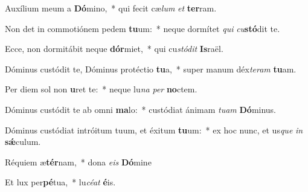 ﻿\item Auxílium meum a \textbf{Dó}mino,~* qui fecit cæ\textit{lum} \textit{et} \textbf{ter}ram.

\item Non det in commotiónem pedem \textbf{tu}um:~* neque dormítet \textit{qui} \textit{cu}\textbf{stó}dit te.

\item Ecce, non dormitábit neque \textbf{dór}miet,~* qui cu\textit{stó}\textit{dit} \textbf{Is}raël.

\item Dóminus custódit te, Dóminus protéctio \textbf{tu}a,~* super manum déx\textit{te}\textit{ram} \textbf{tu}am.

\item Per diem sol non \textbf{u}ret te:~* neque lu\textit{na} \textit{per} \textbf{no}ctem.

\item Dóminus custódit te ab omni \textbf{ma}lo:~* custódiat ánimam \textit{tu}\textit{am} \textbf{Dó}minus.

\item Dóminus custódiat intróitum tuum, et éxitum \textbf{tu}um:~* ex hoc nunc, et us\textit{que} \textit{in} \textbf{sǽ}culum.

\item Réquiem æ\textbf{tér}nam,~* dona \textit{eis} \textbf{Dó}mine

\item Et lux per\textbf{pé}tua,~* lu\textit{céat} \textbf{é}is.
  